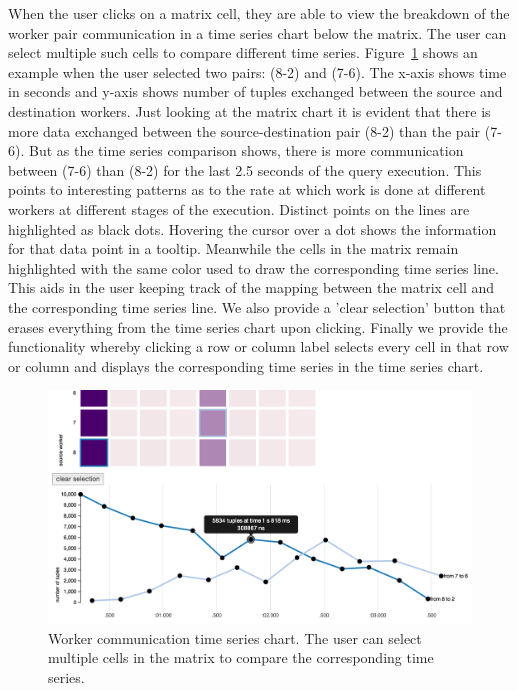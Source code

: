 \documentclass{chi2009}
\begin{document}
When the user clicks on a matrix cell, they are able to view the breakdown of the worker pair communication in a
time series chart below the matrix. The user can select multiple such cells to compare different time
series. Figure~\ref{fig:ts} shows an example when the user selected two pairs: (8-2) and (7-6). The x-axis shows
time in seconds and y-axis shows number of tuples exchanged between the source and destination workers.
Just looking at the matrix chart it is evident that there is more data exchanged between the source-destination pair
(8-2) than the pair (7-6). But as the time series comparison shows, there is more communication between (7-6)
than (8-2) for the last 2.5 seconds of the query execution. This points to interesting patterns as to the rate at which
work is done at different workers at different stages of the execution. Distinct points on the lines are highlighted as
black dots. Hovering the cursor over a dot shows the information for that data point in a tooltip. Meanwhile the cells
in the matrix remain highlighted with the same color used to draw the corresponding time series line. This aids in the
user keeping track of the mapping between the matrix cell and the corresponding time series line. We also provide
a 'clear selection' button that erases everything from the time series chart upon clicking. Finally we provide the
functionality whereby clicking a row or column label selects every cell in that row or column and displays the
corresponding time series in the time series chart.

\begin{figure}[!ht]
  \includegraphics[width=\columnwidth]{images/networkVis2}
  \caption{Worker communication time series chart. The user can select multiple cells in the matrix to compare the
  corresponding time series.}
  \label{fig:ts}
\end{figure}
\end{document}
